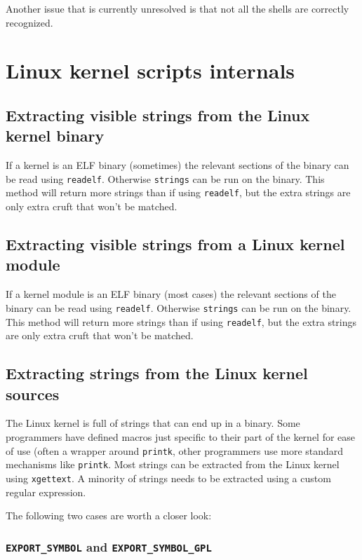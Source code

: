 \documentclass[10pt]{article}
\begin{document}
Another issue that is currently unresolved is that not all the shells are correctly recognized.

\section{Linux kernel scripts internals}

\subsection{Extracting visible strings from the Linux kernel binary}

If a kernel is an ELF binary (sometimes) the relevant sections of the
binary can be read using \texttt{readelf}. Otherwise \texttt{strings} can be
run on the binary. This method will return more strings than if using
\texttt{readelf}, but the extra strings are only extra cruft that won't be
matched.

\subsection{Extracting visible strings from a Linux kernel module}

If a kernel module is an ELF binary (most cases) the relevant sections of the
binary can be read using \texttt{readelf}. Otherwise \texttt{strings} can be
run on the binary. This method will return more strings than if using
\texttt{readelf}, but the extra strings are only extra cruft that won't be
matched.

\subsection{Extracting strings from the Linux kernel sources}

The Linux kernel is full of strings that can end up in a binary. Some
programmers have defined macros just specific to their part of the kernel for
ease of use (often a wrapper around \texttt{printk}, other programmers use
more standard mechanisms like \texttt{printk}. Most strings can be extracted
from the Linux kernel using \texttt{xgettext}. A minority of strings needs to
be extracted using a custom regular expression.

The following two cases are worth a closer look:

\subsubsection{\texttt{EXPORT\_SYMBOL} and \texttt{EXPORT\_SYMBOL\_GPL}}
\end{document}
